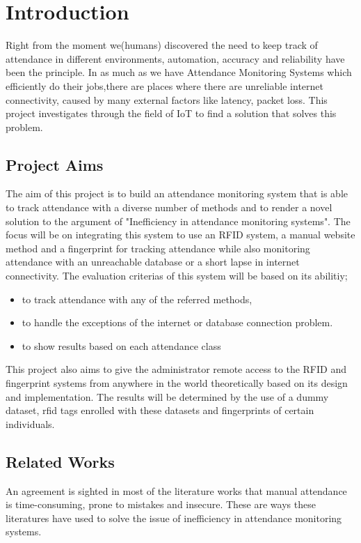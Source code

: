 \chapter{Introduction}
Right from the moment we(humans) discovered the need to keep track of attendance in different environments, automation, accuracy and reliability have been the principle. In as much as we have Attendance Monitoring Systems which efficiently do their jobs,there are places where there are unreliable internet connectivity, caused by many external factors like latency, packet loss. This project investigates through the field of IoT to find a solution that solves this problem.


\section{Project Aims}

The aim of this project is to build an attendance monitoring system that is able to track attendance with a diverse number of methods and to render a novel solution to the argument of "Inefficiency in attendance monitoring systems". The focus will be on integrating this system to use an RFID system, a manual website method and a fingerprint for tracking attendance while also monitoring attendance with an unreachable database or a short lapse in internet connectivity. The evaluation criterias of this system will be based on its abilitiy; 
\begin{itemize}
  \item to track attendance with any of the referred methods,
  \item to handle the exceptions of the internet or database connection problem.
  \item to show results based on each attendance class
\end{itemize} 
This project also aims to give the administrator remote access to the RFID and fingerprint systems from anywhere in the world theoretically based on its design and implementation. The results will be determined by the use of a dummy dataset, rfid tags enrolled with these datasets and fingerprints of certain individuals.
\section{Related Works} 
An agreement is sighted in most of the literature works that manual attendance is time-consuming, prone to mistakes and insecure. These are ways these literatures have used to solve the issue of inefficiency in attendance monitoring systems.

